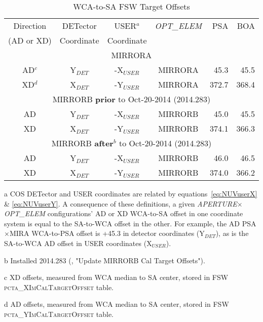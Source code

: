 \begin{center}
\begin{table}
\footnotesize
	\centering
	\begin{threeparttable}
	\caption[\textsc{pcta\_[X,Y]ImCalTargetOffset} Values]{ WCA-to-SA FSW Target Offsets}
		\begin{tabular*}{.95\linewidth}{@{\extracolsep{\fill}}ccccrr}
		\toprule
		Direction & DETector & USER$^{a}$ & \textit{OPT\_ELEM}  &	PSA	&	BOA\\
		(AD or XD) & Coordinate &	Coordinate &	&	\\
		\bottomrule
		\midrule
		\multicolumn{6}{c}{MIRRORA}\\
		\midrule
		AD$^c$	&	Y$_{DET}$	&	-X$_{USER}$	&	MIRRORA	&	45.3	&	45.5 \\
		XD$^d$	&	X$_{DET}$	&	-Y$_{USER}$	&	MIRRORA	&	372.7	&	368.4 \\
		\midrule
		\multicolumn{6}{c}{MIRRORB {\bf prior} to Oct-20-2014 (2014.283)}\\
		\midrule
		AD	&	Y$_{DET}$	&	-X$_{USER}$	&	MIRRORB	&	45.0	&	45.5 \\
		XD	&	X$_{DET}$	&	-Y$_{USER}$	&	MIRRORB	&	374.1	&	366.3 \\
		\midrule
		\multicolumn{6}{c}{MIRRORB {\bf after}$^{b}$ to Oct-20-2014 (2014.283)}\\
		\midrule
		AD	&	Y$_{DET}$	&	-X$_{USER}$	&	MIRRORB	&	46.0	&	46.5 \\
		XD	&	X$_{DET}$	&	-Y$_{USER}$	&	MIRRORB	&	374.0	&	366.2 \\
		\bottomrule
		\end{tabular*}
		\label{tab:pctaWCA2SANIM}
		\scriptsize
		\begin{tablenotes}
			\item[a] COS DETector and USER coordinates are related by equations~\ref{eq:NUVuserX} \& \ref{eq:NUVuserY}. A consequence of
			these definitions, a given \textit{APERTURE}$\times$\textit{OPT\_ELEM} configurations' AD or XD WCA-to-SA offset in one coordinate system is equal to the SA-to-WCA offset in the other.
			For example, the AD PSA$\times$MIRA WCA-to-PSA offset is +45.3 in detector coordinates (Y$_{DET}$), as is the SA-to-WCA AD offset in USER coordinates (X$_{USER}$).
			\item[b] Installed 2014.283 (, "Update MIRRORB Cal Target Offsets").
			\item[c] XD  offsets, measured from WCA median to  SA center, stored in  FSW \textsc{pcta\_XImCalTargetOffset} table.
			\item[d] AD  offsets, measured from WCA  median to SA center, stored in  FSW \textsc{pcta\_YImCalTargetOffset} table.
		\end{tablenotes}
		\normalsize
	\end{threeparttable}
\normalsize
\end{table}
\end{center}
